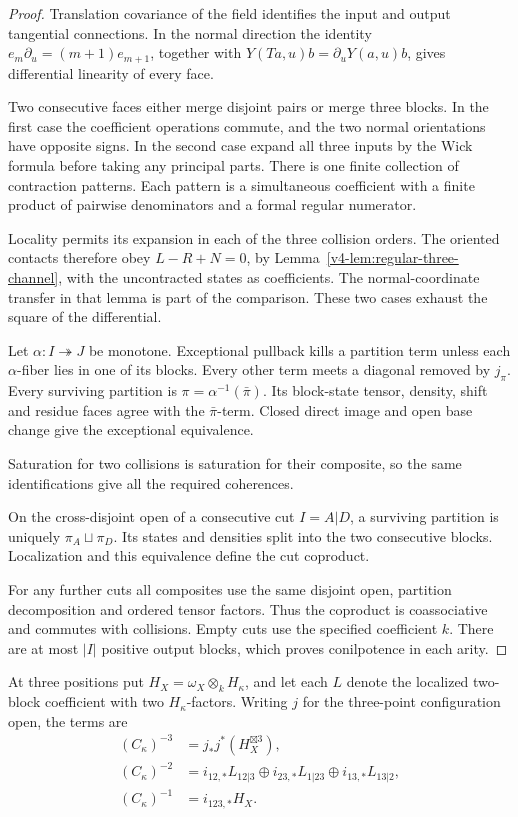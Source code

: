 \begin{proof}
Translation covariance of the field identifies the
input and output tangential connections. In the normal
direction the identity
\(e_m\partial_u=(m+1)e_{m+1}\), together with
\(Y(Ta,u)b=\partial_uY(a,u)b\), gives differential
linearity of every face.

Two consecutive faces either merge disjoint pairs or
merge three blocks. In the first case the coefficient
operations commute, and the two normal orientations
have opposite signs. In the second case expand all
three inputs by the Wick formula before taking any
principal parts. There is one finite collection of
contraction patterns. Each pattern is a simultaneous
coefficient with a finite product of pairwise
denominators and a formal regular numerator.

Locality permits its expansion in each of the three
collision orders. The oriented contacts therefore
obey \(L-R+N=0\), by
Lemma~\ref{v4-lem:regular-three-channel}, with the
uncontracted states as coefficients.
The normal-coordinate transfer in that lemma is
part of the comparison. These two cases exhaust the
square of the differential.

Let \(\alpha:I\twoheadrightarrow J\) be monotone.
Exceptional pullback kills a partition term unless
each \(\alpha\)-fiber lies in one of its blocks.
Every other term meets a diagonal removed by \(j_\pi\).
Every surviving partition is
\(\pi=\alpha^{-1}(\bar\pi)\). Its block-state tensor,
density, shift and residue faces agree with the
\(\bar\pi\)-term. Closed direct image and open
base change give the exceptional equivalence.

Saturation for two collisions is saturation for
their composite, so the same identifications give
all the required coherences.

On the cross-disjoint open of a consecutive cut
\(I=A|D\), a surviving partition is uniquely
\(\pi_A\sqcup\pi_D\). Its states and densities
split into the two consecutive blocks. Localization
and this equivalence define the cut coproduct.

For any further cuts all composites use the same
disjoint open, partition decomposition and ordered
tensor factors. Thus the coproduct is coassociative
and commutes with collisions. Empty cuts use the
specified coefficient \(k\). There are at most
\(|I|\) positive output blocks, which proves
conilpotence in each arity.
\end{proof}

At three positions put
\(H_X=\omega_X\otimes_k H_\kappa\), and let each
\(L\) denote the localized two-block coefficient
with two \(H_\kappa\)-factors. Writing \(j\) for
the three-point configuration open, the terms are
\[
 \begin{aligned}
 (C_\kappa)^{-3}&=j_*j^*(H_X^{\boxtimes3}),\\
 (C_\kappa)^{-2}&=
    i_{12,*}L_{12|3}\oplus i_{23,*}L_{1|23}
                              \oplus i_{13,*}L_{13|2},\\
 (C_\kappa)^{-1}&=i_{123,*}H_X.
 \end{aligned}
\]

